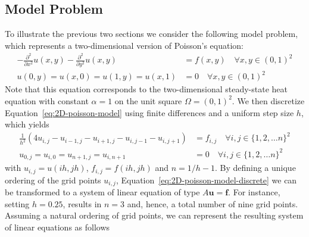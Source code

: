 \subsection{Model Problem}
To illustrate the previous two sections we consider the following model problem, which represents a two-dimensional version of Poisson's equation:
\begin{equation}
	\begin{split}
		-\frac{\partial^2}{\partial x^2} u(x,y) - \frac{\partial^2}{\partial y^2} u(x,y) & = f(x, y) \quad \forall x, y \in (0, 1)^2 \\
		u(0, y) = u(x, 0) = u(1, y) = u(x, 1) & = 0 \quad \forall x, y \in (0, 1)^2
	\end{split}
	\label{eq:2D-poisson-model}
\end{equation}
Note that this equation corresponds to the two-dimensional steady-state heat equation with constant $\alpha = 1$ on the unit square $\Omega = \left( 0, 1 \right)^2$.
We then discretize Equation~\eqref{eq:2D-poisson-model} using finite differences and a uniform step size $h$, which yields
\begin{equation}
	\begin{split}
		\frac{1}{h^2} (4 u_{i,j} - u_{i-1, j} - u_{i+1, j} - u_{i, j-1} - u_{i, j+1}) & = f_{i, j} \quad \forall i, j \in \{1, 2, \dots n\}^2 \\
		u_{0, j} = u_{i, 0} = u_{n+1, j} = u_{i, n+1} & = 0 \quad \forall i, j \in \{1, 2, \dots n\}^2
	\end{split} 
	\label{eq:2D-poisson-model-discrete}
\end{equation}
with $u_{i,j} = u(ih, jh)$, $f_{i,j} = f(ih, jh)$ and $n = 1/h - 1$.
By defining a unique ordering of the grid points $u_{i, j}$, Equation~\eqref{eq:2D-poisson-model-discrete} we can be transformed to a system of linear equation of type $A \bm{u} = \bm{f}$. 
For instance, setting $h = 0.25$, results in $n = 3$ and, hence, a total number of nine grid points.
Assuming a natural ordering of grid points, we can represent the resulting system of linear equations as follows
